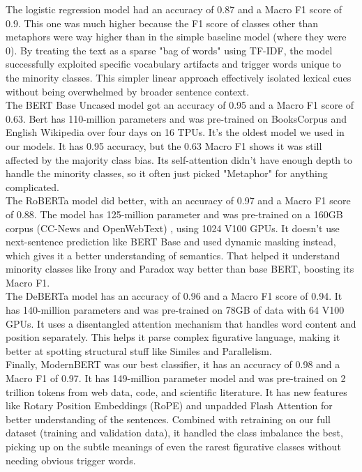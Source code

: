 \documentclass[11pt]{article}
\begin{document}
The logistic regression model had an accuracy of 0.87 and a Macro F1 score of 0.9. 
This one was much higher because the F1 score of classes other than metaphors were way 
higher than in the simple baseline model (where they were 0). By treating the text as a 
sparse "bag of words" using TF-IDF, the model successfully exploited specific vocabulary
 artifacts and trigger words unique to the minority classes. This simpler linear 
 approach effectively isolated lexical cues without being overwhelmed by broader
  sentence context. \\

The BERT Base Uncased model got an accuracy of 0.95 and a Macro F1 score of 0.63. 
Bert has 110-million parameters and was pre-trained on BooksCorpus and English 
Wikipedia over four days on 16 TPUs. It's the oldest model we used in our models. It has 0.95 
accuracy, but the 0.63 Macro F1 shows it was still affected
 by the majority class bias. Its self-attention didn't have enough depth 
 to handle the minority classes, so it often just picked "Metaphor" for anything
  complicated. \\

The RoBERTa model did better, with an accuracy of 0.97 and a Macro F1 score of 0.88. 
The model has 125-million parameter and was pre-trained on a 160GB corpus (CC-News and OpenWebText)
, using 1024 V100 GPUs. It doesn't use next-sentence 
prediction like BERT Base and used dynamic masking instead, which gives it a better understanding of semantics.
 That helped it understand minority classes like Irony and Paradox way better than base 
 BERT, boosting its Macro F1. \\

The DeBERTa model has an accuracy of 0.96 and a Macro F1 score of 0.94.
 It has 140-million parameters and was pre-trained on 78GB of data with 64 V100 GPUs.
  It uses a disentangled attention mechanism that handles word 
  content and position separately. This helps it parse complex 
  figurative language, making it better at spotting structural stuff like Similes 
  and Parallelism. \\

Finally, ModernBERT was our best classifier, it has an accuracy of 0.98 
and a Macro F1 of 0.97. It has 149-million parameter model and was pre-trained on 
2 trillion tokens from web data, code, and scientific literature. It has new features
 like Rotary Position Embeddings (RoPE) and unpadded Flash Attention for 
better understanding of the sentences. Combined with retraining on our full dataset (training and validation data), 
it handled the class imbalance the best, picking up on the subtle meanings of
 even the rarest figurative classes without needing obvious trigger words. \\
\end{document}
